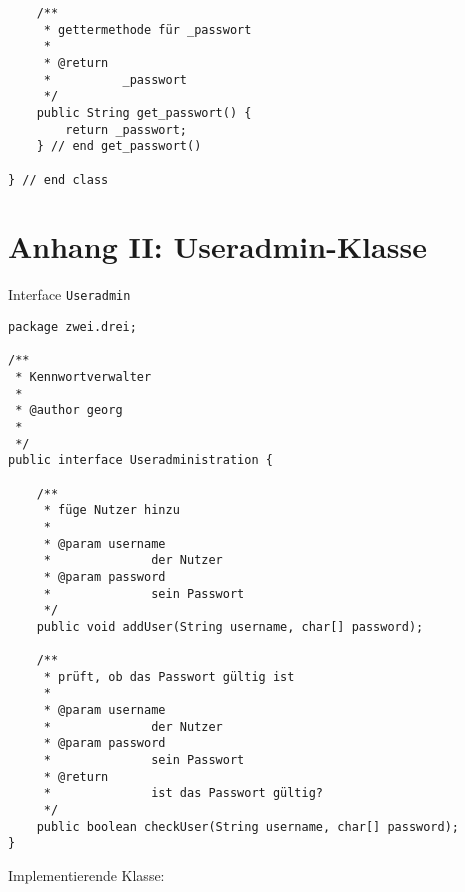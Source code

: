 \documentclass[twoside]{article}
\begin{document}
\begin{lstlisting}
    /**
     * gettermethode für _passwort
     * 
     * @return
     * 			_passwort
     */
    public String get_passwort() {
        return _passwort;
    } // end get_passwort()

} // end class
\end{lstlisting}

\newpage
\section*{Anhang II: Useradmin-Klasse}
\label{admin}
Interface \texttt{Useradmin}
\begin{lstlisting}
package zwei.drei;

/**
 * Kennwortverwalter
 * 
 * @author georg
 *
 */
public interface Useradministration {
	
	/**
	 * füge Nutzer hinzu
	 * 
	 * @param username
	 * 				der Nutzer
	 * @param password
	 * 				sein Passwort
	 */
	public void addUser(String username, char[] password);
	
	/**
	 * prüft, ob das Passwort gültig ist
	 * 
	 * @param username
	 * 				der Nutzer
	 * @param password
	 * 				sein Passwort
	 * @return
	 * 				ist das Passwort gültig?
	 */
	public boolean checkUser(String username, char[] password);
}
\end{lstlisting}
Implementierende Klasse:
\end{document}
